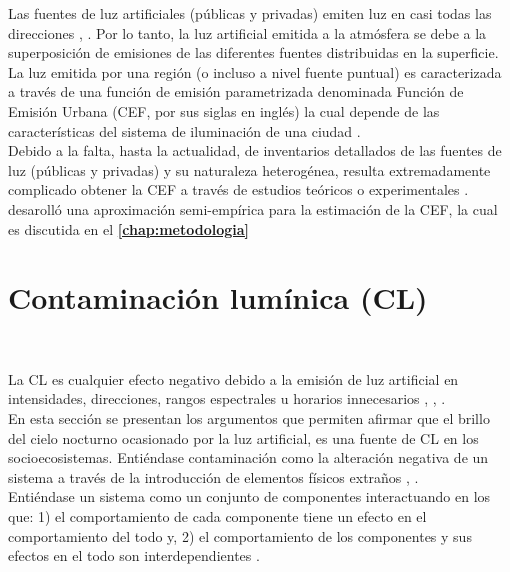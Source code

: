 Las fuentes de luz artificiales (públicas y privadas) emiten luz en casi todas las direcciones \citep{Kocifaj2014}, \citep{Kocifaj2016}. Por lo tanto, la luz artificial emitida a la atmósfera se debe a la superposición de emisiones de las diferentes fuentes distribuidas en la superficie.\\

La luz emitida por una región (o incluso a nivel fuente puntual) es caracterizada a través de una función de emisión parametrizada denominada Función de Emisión Urbana (CEF, por sus siglas en inglés) la cual depende de las características del sistema de iluminación de una ciudad \citep{Kocifaj2014}.\\

Debido a la falta, hasta la actualidad, de inventarios detallados de las fuentes de luz (públicas y privadas) y su naturaleza heterogénea, resulta extremadamente complicado obtener la CEF a través de estudios teóricos o experimentales \citep{Kocifaj2014}. \cite{Garstang1986} desarolló una aproximación semi-empírica para la estimación de la CEF, la cual es discutida en el \textbf{\autoref{chap:metodologia}}

\newpage

\section{Contaminación lumínica (CL)}\\
\label{sec:contaminacionluminica}

La CL es cualquier efecto negativo debido a la emisión de luz artificial en intensidades, direcciones, rangos espectrales u horarios innecesarios \citep{AtlasREPSA}, \citep{LibroCL}, \citep{Stone2017}.\\

En esta sección se presentan los argumentos que permiten afirmar que el brillo del cielo nocturno ocasionado por la luz artificial, es una fuente de CL en los socioecosistemas. Entiéndase contaminación como la alteración negativa de un sistema a través de la introducción de elementos físicos extraños \citep{AtlasREPSA}, \citep{LibroCL}.\\

Entiéndase un sistema como un conjunto de componentes interactuando en los que: 1) el comportamiento de cada componente tiene un efecto en el comportamiento del todo y, 2) el comportamiento de los componentes y sus efectos en el todo son interdependientes \citep{Avila2019}.\\

